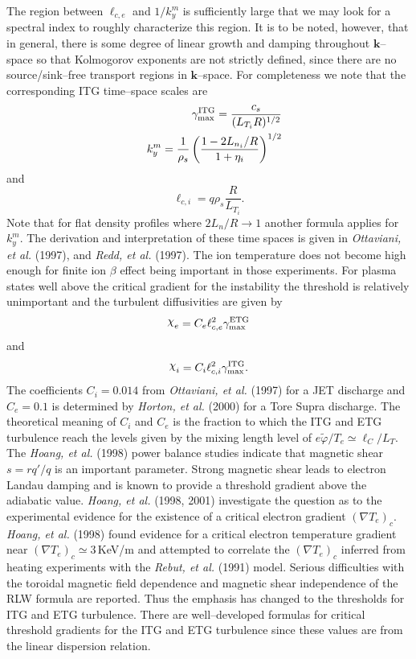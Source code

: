 \documentclass[a4paper,openany,12pt]{book}
\def\chix{\raise.5ex\hbox{$\chi$}}
\begin{document}
The region between 
$\ell_{c,e}$ and $1/k_y^m$ is sufficiently large that we may look for a spectral index to roughly characterize this region. It is to be noted, however, that in general, there is some degree of linear growth and damping throughout $\bm{k}$--space so that Kolmogorov exponents are not strictly defined, since there are no source/sink--free transport regions in 
$\bm{k}$--space. For completeness we note that the corresponding ITG time--space scales are
\begin{eqnarray}
&&\gamma_{\rm max}^{\rm ITG} = {c_s\over (L_{T_i}R)^{1/2}}\label{E9.22}\\
&&k_y^m = \frac{1}{\rho_s}\left(\frac{1-2L_{n_i}/R}{1+\eta_i}\right)^{1/2}\label{E9.23}
\end{eqnarray}
and
\begin{equation}
\ell_{c,i} = q\rho_s\frac{R}{L_{T_i}}.\label{E9.24}
\end{equation}
Note that for flat density profiles where $2L_n/R\to 1$ another formula applies for $k_y^m$. The derivation and interpretation of these time spaces is given in \emph{Ottaviani, et al.} (1997), and \emph{Redd, et al.} (1997). The ion temperature does not become high enough for finite ion 
$\beta$ effect being important in those experiments. For plasma states well above the critical gradient for the instability the threshold is relatively unimportant and the turbulent diffusivities are given by
\begin{equation}
\chix_e=C_e\ell_{c,e}^2\gamma_{\rm max}^{\rm ETG}\label{E9.25}
\end{equation}
and
\begin{equation}
\chix_i=C_i\ell_{c,i}^2\gamma_{\rm max}^{\rm ITG}.\label{E9.26}
\end{equation}
The coefficients $C_i=0.014$ from \emph{Ottaviani, et al.} (1997) for a JET discharge and $C_e=0.1$ is determined by \emph{Horton, et al.} (2000) for a Tore Supra discharge. The theoretical meaning of $C_i$ and $C_e$ is the fraction to which the ITG and ETG turbulence reach the levels given by the mixing length level of $e\widetilde\varphi/T_e\simeq\ell_C/L_T$. The \emph{Hoang, et al.} (1998) power balance studies indicate that magnetic shear $s=rq'/q$ is an important parameter. Strong magnetic shear leads to electron Landau damping and is known to provide a threshold gradient above the adiabatic value. \emph{Hoang, et al.} (1998, 2001) investigate the question as to the experimental evidence for the existence of a critical electron gradient 
$(\nabla T_e)_c$. \emph{Hoang, et al.} (1998) found evidence for a critical electron temperature gradient near $(\nabla T_e)_c\simeq 3\,$KeV/m and attempted to correlate the $(\nabla T_e)_c$ inferred from heating experiments with the \emph{Rebut, et al.} (1991) model. Serious difficulties with the toroidal magnetic field dependence and magnetic shear independence of the RLW formula are reported. Thus the emphasis has changed to the thresholds for ITG and ETG turbulence. There are well--developed formulas for critical threshold gradients for the ITG and ETG turbulence since these values are from the linear dispersion relation. 
\end{document}
